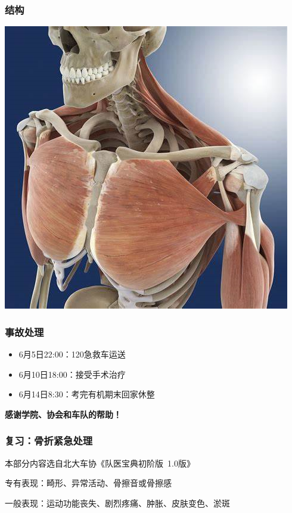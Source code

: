 \documentclass[12pt,AutoFakeBold]{beamer}
\begin{document}
    \begin{frame}
        \frametitle{结构}
    
        \begin{center}
            \includegraphics[width=0.618\paperwidth]{figures/example.png}
        \end{center}
    
    \end{frame}

    \begin{frame}
        \frametitle{事故处理}
        \begin{itemize}
            \item 6月5日22:00：120急救车运送
            \item 6月10日18:00：接受手术治疗
            \item 6月14日8:30：考完有机期末回家休整
        \end{itemize}
        \begin{center}
            \textbf{感谢学院、协会和车队的帮助！}
        \end{center}
    \end{frame}

    \begin{frame}
        \frametitle{复习：骨折紧急处理}
        本部分内容选自北大车协《队医宝典初阶版\ 1.0版》
        
        专有表现：畸形、异常活动、骨擦音或骨擦感

        一般表现：运动功能丧失、剧烈疼痛、肿胀、皮肤变色、淤斑
    \end{frame}
\end{document}
